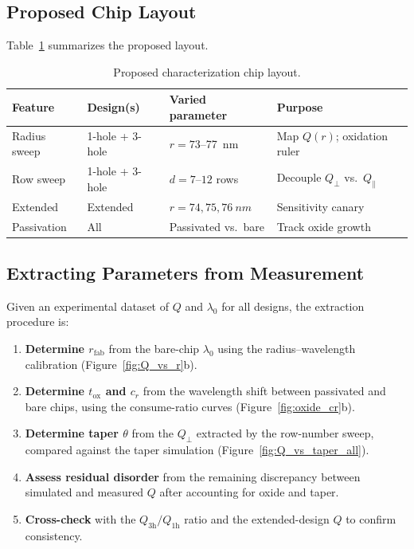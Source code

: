 \documentclass[11pt,a4paper]{article}
\begin{document}
\subsection{Proposed Chip Layout}

Table~\ref{tab:chip} summarizes the proposed layout.

\begin{table}[htbp]
  \centering
  \caption{Proposed characterization chip layout.}
  \label{tab:chip}
  \begin{tabular}{@{}llll@{}}
    \toprule
    Feature & Design(s) & Varied parameter & Purpose \\
    \midrule
    Radius sweep  & 1-hole + 3-hole & $r = 73$--\SI{77}{nm} & Map $Q(r)$; oxidation ruler \\
    Row sweep     & 1-hole + 3-hole & $d = 7$--$12$ rows & Decouple $Q_\perp$ vs.\ $Q_\parallel$ \\
    Extended      & Extended        & $r = 74, 75, \SI{76}{nm}$ & Sensitivity canary \\
    Passivation   & All             & Passivated vs.\ bare & Track oxide growth \\
    \bottomrule
  \end{tabular}
\end{table}

\subsection{Extracting Parameters from Measurement}
\label{sec:extraction}

Given an experimental dataset of $Q$ and $\lambda_0$ for all designs, the extraction procedure is:
\begin{enumerate}
  \item \textbf{Determine $r_\mathrm{fab}$} from the bare-chip $\lambda_0$ using the radius--wavelength calibration (Figure~\ref{fig:Q_vs_r}b).
  \item \textbf{Determine $t_\mathrm{ox}$ and $c_r$} from the wavelength shift between passivated and bare chips, using the consume-ratio curves (Figure~\ref{fig:oxide_cr}b).
  \item \textbf{Determine taper $\theta$} from the $Q_\perp$ extracted by the row-number sweep, compared against the taper simulation (Figure~\ref{fig:Q_vs_taper_all}).
  \item \textbf{Assess residual disorder} from the remaining discrepancy between simulated and measured $Q$ after accounting for oxide and taper.
  \item \textbf{Cross-check} with the $Q_\mathrm{3h}/Q_\mathrm{1h}$ ratio and the extended-design $Q$ to confirm consistency.
\end{enumerate}
\end{document}
